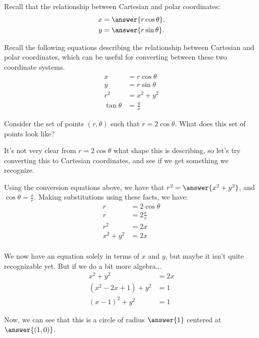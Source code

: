 \documentclass{ximera}
\begin{document}
Recall that the relationship between Cartesian and polar coordinates:
\begin{align*}
x &= \answer{r\cos\theta},\\
y &= \answer{r\sin\theta}.
\end{align*}

Recall the following equations describing the relationship between Cartesian and polar coordinates, which can be useful for converting between these two coordinate systems.
\begin{align*}
x &= r\cos\theta\\
y &= r\sin\theta\\
r^2 &= x^2 +y^2\\
\tan\theta &= \frac{y}{x}
\end{align*}

\begin{example}
Consider the set of points $(r,\theta)$ such that $r = 2\cos\theta$. What does this set of points look like?

It's not very clear from $r=2\cos\theta$ what shape this is describing, so let's try converting this to Cartesian coordinates, and see if we get something we recognize.

Using the conversion equations above, we have that $r^2 = \answer{x^2+y^2}$, and $\cos\theta = \frac{x}{r}$. Making substitutions using these facts, we have:
\begin{align*}
r &= 2\cos\theta\\
r &= 2\frac{x}{r}\\
r^2 &= 2x\\
x^2+y^2 &= 2x\\
\end{align*}

We now have an equation solely in terms of $x$ and $y$, but maybe it isn't quite recognizable yet. But if we do a bit more algebra...
\begin{align*}
x^2 + y^2 &= 2x\\
(x^2-2x+1) + y^2 &= 1\\
(x-1)^2 + y^2 &=1
\end{align*}

Now, we can see that this is a circle of radius $\answer{1}$ centered at $\answer{(1,0)}$.

\begin{image}
\end{image}

\end{example}
\end{document}
